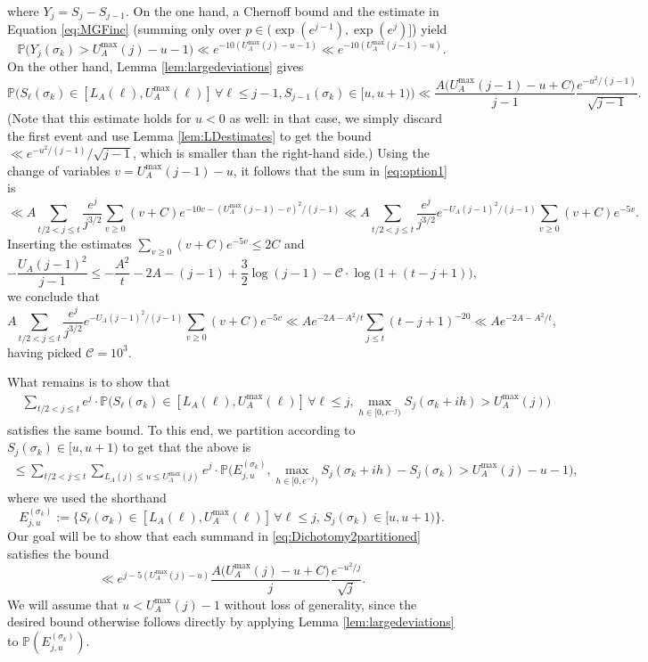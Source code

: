 \documentclass{amsart}
\theoremstyle{definition}
\theoremstyle{remark}
\numberwithin{equation}{section}
\begin{document}
where $Y_j=S_j-S_{j-1}$. On the one hand, a Chernoff bound and the estimate in Equation \eqref{eq:MGFinc} (summing only over $p\in (\exp(e^{j-1}),\exp(e^{j})]$) yield
\[
    \mathbb{P}\big(Y_j(\sigma_k)>U_A^{\max}(j)-u-1\big) \ll e^{-10(U_A^{\text{max}}(j)-u-1)} \ll e^{-10(U_A^{\max}(j-1)-u)}.
\]
On the other hand, Lemma \ref{lem:largedeviations} gives
\[
    \mathbb{P}\Big(S_\ell(\sigma_k)\in [L_A(\ell), U_A^{\text{max}}(\ell)] \,\forall \ell\leq j-1, S_{j-1}(\sigma_k)\in[u,u+1) \Big) \ll \frac{A\big(U_A^{\text{max}}(j-1)-u+C\big)}{j-1}\frac{e^{-u^2/(j-1)}}{\sqrt{j-1}}.
\]
(Note that this estimate holds for $u<0$ as well: in that case, we simply discard the first event and use Lemma \ref{lem:LDestimates} to get the bound $\ll {e^{-u^2/(j-1)}}/{\sqrt{j-1}}$, which is smaller than the right-hand side.) 
Using the change of variables $v=U_A^{\text{max}}(j-1)-u$, it follows that the sum in \eqref{eq:option1} is
\begin{equation}\label{eq:dichotomyIfinal}
    \ll A\sum_{t/2<j\leq t} \frac{e^{j}}{j^{3/2}}\sum_{v\geq 0} (v+C)e^{-10v-(U^{\text{max}}_A(j-1)-v)^2/(j-1)} \ll A\sum_{t/2<j\leq t} \frac{e^{j}}{j^{3/2}}e^{-U_A(j-1)^2/(j-1)}\sum_{v\geq 0}(v+C)e^{-5v}.
\end{equation}
Inserting the estimates $\sum_{v\geq 0}(v+C)e^{-5v}\leq 2C$ and
\[  
    -\frac{U_A(j-1)^2}{j-1}\leq-\frac{A^2}{t}-2A-(j-1)+\frac{3}{2}\log (j-1)-\mathcal{C}\cdot \log\big(1+(t-j+1)\big),
\]
we conclude that
\[
    A\sum_{t/2<j\leq t} \frac{e^{j}}{j^{3/2}}e^{-U_A(j-1)^2/(j-1)}\sum_{v\geq 0}(v+C)e^{-5v} \ll Ae^{-2A-A^2/t} \sum_{j\leq t} (t-j+1)^{-20} \ll Ae^{-2A-A^2/t},
\]
having picked $\mathcal{C}=10^3$.


What remains is to show that
\begin{align}
    &\sum_{t/2<j\leq t} e^{j}\cdot\mathbb{P}\Big(S_\ell(\sigma_k)\in [L_A(\ell), U_A^{\text{max}}(\ell)] \,\forall \ell\leq j, \max_{h\in [0,e^{-j})} S_{j}(\sigma_k+ih)>U_A^{\max}(j) \Big)\label{eq:option2}
\end{align}
satisfies the same bound. To this end, we partition according to $S_j(\sigma_k)\in [u,u+1)$ to get that the above is
\begin{align}\label{eq:Dichotomy2partitioned}
    \leq \sum_{t/2<j\leq t} \sum_{L_A(j)\leq u\leq U_A^{\max} (j)}e^{j}\cdot\mathbb{P}\Big(E_{j,u}^{(\sigma_k)},\max_{h\in [0,e^{-j})} S_{j}(\sigma_k+ih)-S_j(\sigma_k)>U_A^{\max}(j)-u-1 \Big),
\end{align}
where we used the shorthand
\begin{equation}\label{eq:E}
    E_{j,u}^{(\sigma_k)}:=\big\{S_\ell(\sigma_k)\in [L_A(\ell), U_A^{\text{max}}(\ell)] \,\forall \ell\leq j,\, S_j(\sigma_k)\in [u,u+1)\big\}.
\end{equation}
Our goal will be to show that each summand in \eqref{eq:Dichotomy2partitioned} satisfies the bound
\[
\ll e^{j-5(U_A^{\max}(j)-u)}\frac{A\big(U_A^{\text{max}}(j)-u+C\big)}{j}\frac{e^{-u^2/j}}{\sqrt{j}}.
\]
We will assume that $u<U_A^{\max}(j)-1$ without loss of generality, since the desired bound otherwise follows directly by applying Lemma \ref{lem:largedeviations} to $\mathbb{P}(E_{j,u}^{(\sigma_k)})$.
\end{document}

